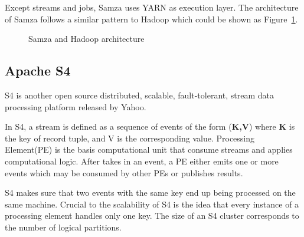 Except streams and jobs, Samza uses YARN as execution layer. The architecture of Samza follows a similar pattern to Hadoop which could be shown as Figure~\ref{fig:smaza_architecture}.

\begin{figure}
  \begin{center}
   \caption{Samza and Hadoop architecture}
   \label{fig:smaza_architecture}
  \end{center}
\end{figure}

\subsection{Apache S4}
S4 is another open source distributed, scalable, fault-tolerant, stream data processing platform released by Yahoo.

In S4, a stream is defined as a sequence of events of the form (\textbf{K,V}) where \textbf{K} is the key of record tuple, and V is the corresponding value. Processing Element(PE) is the basis computational unit that consume streams and applies computational logic. After takes in an event, a PE either emits one or more events which may be consumed by other PEs or publishes results\cite{neumeyer2010s4}.

S4 makes sure that two events with the same key end up being processed on the same machine. Crucial to the scalability of S4 is the idea that every instance of a processing element handles only one key. The size of an S4 cluster corresponds to the number of logical partitions. 
 
\clearpage